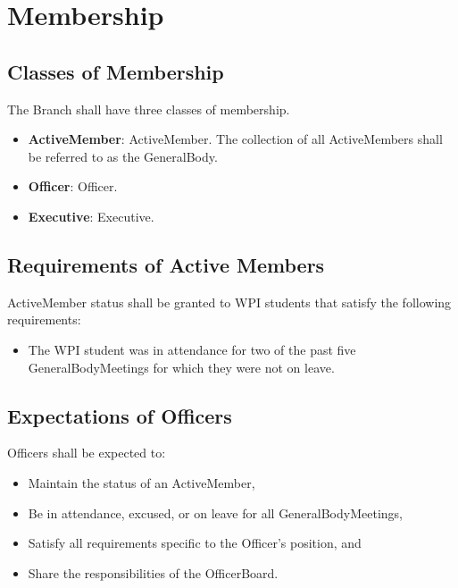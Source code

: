 \chapter{Membership}\label{Bylaw:Membership}

\section{Classes of Membership}\label{Bylaw:Membership:Classes}
    The \gls{Branch} shall have three classes of membership.
    \begin{itemize}
        \item{\textbf{\Gls{ActiveMember}}: \Glsdesc{ActiveMember}. The collection of all \glspl{ActiveMember} shall be referred to as the \gls{GeneralBody}.}
        \item{\textbf{\Gls{Officer}}: \Glsdesc{Officer}.}
        \item{\textbf{\Gls{Executive}}: \Glsdesc{Executive}.}
    \end{itemize}

\section{Requirements of Active Members}\label{Bylaw:Membership:ActiveMemberRequirements}
	\Gls{ActiveMember} status shall be granted to \gls{WPI} students that satisfy the following requirements:
	\begin{itemize}
		\item{The \gls{WPI} student was in attendance for two of the past five \glspl{GeneralBodyMeeting} for which they were not on leave.}
	\end{itemize}

\section{Expectations of \Glspl{Officer}}\label{Bylaw:Membership:OfficerExpectations}
	\Glspl{Officer} shall be expected to:
	\begin{itemize}
		\item{Maintain the status of an \gls{ActiveMember},}
		\item{Be in attendance, excused, or on leave for all \glspl{GeneralBodyMeeting},}
		\item{Satisfy all requirements specific to the \gls{Officer}'s position, and}
		\item{Share the responsibilities of the \gls{OfficerBoard}.}
	\end{itemize}

